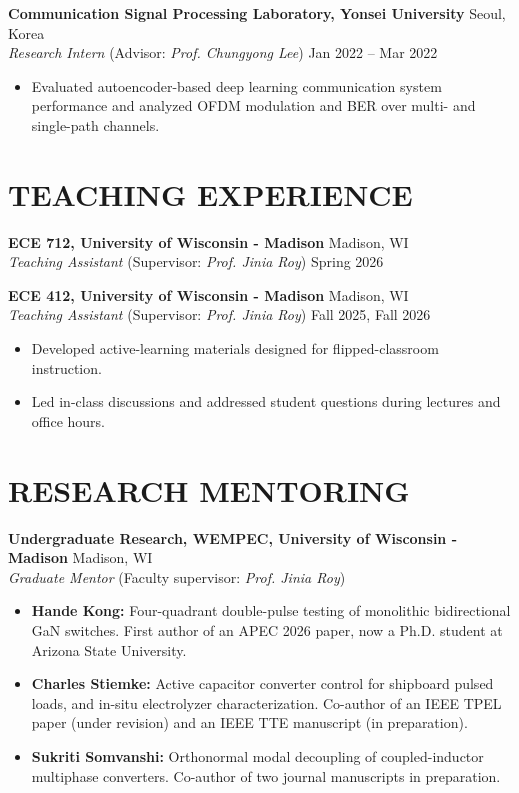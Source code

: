 \documentclass[a4paper,9pt]{extarticle}
\begin{document}
\noindent
\textbf{Communication Signal Processing Laboratory, Yonsei University} \hfill Seoul, Korea\\
\textit{Research Intern} (Advisor: \textit{Prof. Chungyong Lee}) \hfill Jan 2022 – Mar 2022
\begin{itemize}
    \item Evaluated autoencoder-based deep learning communication system performance and analyzed OFDM modulation and BER over multi- and single-path channels.
\end{itemize}


\section*{TEACHING EXPERIENCE}
\noindent
\textbf{ECE 712, University of Wisconsin - Madison} \hfill Madison, WI\\
\textit{Teaching Assistant} (Supervisor: \textit{Prof. Jinia Roy}) \hfill Spring 2026

\medskip
\noindent
\textbf{ECE 412, University of Wisconsin - Madison} \hfill Madison, WI\\
\textit{Teaching Assistant} (Supervisor: \textit{Prof. Jinia Roy}) \hfill Fall 2025, Fall 2026
\begin{itemize}
    \item Developed active-learning materials designed for flipped-classroom instruction.
    \item Led in-class discussions and addressed student questions during lectures and office hours.
\end{itemize}

\section*{RESEARCH MENTORING}
\noindent
\textbf{Undergraduate Research, WEMPEC, University of Wisconsin - Madison} \hfill Madison, WI\\
\textit{Graduate Mentor} (Faculty supervisor: \textit{Prof. Jinia Roy})
\begin{itemize}
    \item \textbf{Hande Kong:} Four-quadrant double-pulse testing of monolithic bidirectional GaN switches. First author of an APEC 2026 paper, now a Ph.D. student at Arizona State University.
    \item \textbf{Charles Stiemke:} Active capacitor converter control for shipboard pulsed loads, and in-situ electrolyzer characterization. Co-author of an IEEE TPEL paper (under revision) and an IEEE TTE manuscript (in preparation).
    \item \textbf{Sukriti Somvanshi:} Orthonormal modal decoupling of coupled-inductor multiphase converters. Co-author of two journal manuscripts in preparation.
\end{itemize}
\end{document}
